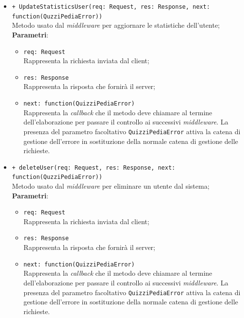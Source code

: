 \begin{itemize}
\begin{itemize}
\begin{itemize}
		 \end{itemize}
		 \item
		\texttt{+ UpdateStatisticsUser(req: Request, res: Response, next: \\function(QuzziPediaError))} \\
		Metodo usato dal \textit{middleware} per aggiornare le statistiche dell'utente; \\
		\textbf{Parametri}:
		 \begin{itemize}
		  \item
			\texttt{req: Request} \\
			Rappresenta la richiesta inviata dal client;
		  \item
			\texttt{res: Response} \\
			Rappresenta la risposta che fornirà il server;
		  \item
		    \texttt{next: function(QuizziPediaError)} \\
			Rappresenta la \textit{callback} che il metodo deve chiamare al termine dell'elaborazione per passare il controllo ai successivi \textit{middleware}. La presenza del parametro facoltativo \texttt{QuizziPediaError} attiva la catena di gestione dell'errore in sostituzione della normale catena di gestione delle richieste.
		 \end{itemize}
		 \item
		 \texttt{+ deleteUser(req: Request, res: Response, next: function(QuzziPediaError))} \\
		Metodo usato dal \textit{middleware} per eliminare un utente dal sistema; \\
		\textbf{Parametri}:
		 \begin{itemize}
		  \item
			\texttt{req: Request} \\
			Rappresenta la richiesta inviata dal client;
		  \item
			\texttt{res: Response} \\
			Rappresenta la risposta che fornirà il server;
		  \item
		    \texttt{next: function(QuizziPediaError)} \\
			Rappresenta la \textit{callback} che il metodo deve chiamare al termine dell'elaborazione per passare il controllo ai successivi \textit{middleware}. La presenza del parametro facoltativo \texttt{QuizziPediaError} attiva la catena di gestione dell'errore in sostituzione della normale catena di gestione delle richieste.
		 \end{itemize}

\end{itemize}
\end{itemize}

